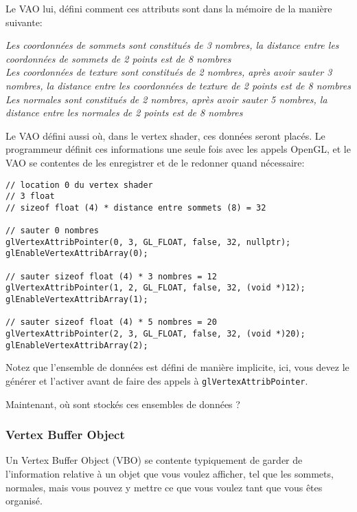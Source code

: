 \documentclass[pdftex, 11pt, a4paper, titlepage]{article}
\begin{document}
Le VAO lui, défini comment ces attributs sont dans la mémoire de la
manière suivante:

\emph{Les coordonnées de sommets sont constitués de 3 nombres, la
  distance entre les coordonnées de sommets de 2 points est de 8
  nombres\\}
\emph{Les coordonnées de texture sont constitués de 2
  nombres, après avoir sauter 3 nombres, la distance entre les
  coordonnées de texture de 2 points est de 8 nombres\\}
\emph{Les normales sont constitués de 2 nombres, après avoir sauter
 5 nombres, la distance entre les normales de 2 points est de 8
 nombres\\}

\pagebreak

Le VAO défini aussi où, dans le vertex shader, ces données seront
placés.  Le programmeur définit ces informations une seule fois avec
les appels OpenGL, et le VAO se contentes de les enregistrer et de le
redonner quand nécessaire:

\begin{lstlisting}
// location 0 du vertex shader
// 3 float
// sizeof float (4) * distance entre sommets (8) = 32

// sauter 0 nombres
glVertexAttribPointer(0, 3, GL_FLOAT, false, 32, nullptr);
glEnableVertexAttribArray(0);

// sauter sizeof float (4) * 3 nombres = 12
glVertexAttribPointer(1, 2, GL_FLOAT, false, 32, (void *)12);
glEnableVertexAttribArray(1);

// sauter sizeof float (4) * 5 nombres = 20 
glVertexAttribPointer(2, 3, GL_FLOAT, false, 32, (void *)20);
glEnableVertexAttribArray(2);
\end{lstlisting}

Notez que l'ensemble de données est défini de manière implicite, ici,
vous devez le générer et l'activer avant de faire des appels à
\texttt{glVertexAttribPointer}.

Maintenant, où sont stockés ces ensembles de données ?

\pagebreak

\subsubsection{Vertex Buffer Object}

Un Vertex Buffer Object (VBO) se contente typiquement de garder de
l'information relative à un objet que vous voulez afficher, tel que
les sommets, normales, mais vous pouvez y mettre ce que vous voulez
tant que vous êtes organisé.
\end{document}

